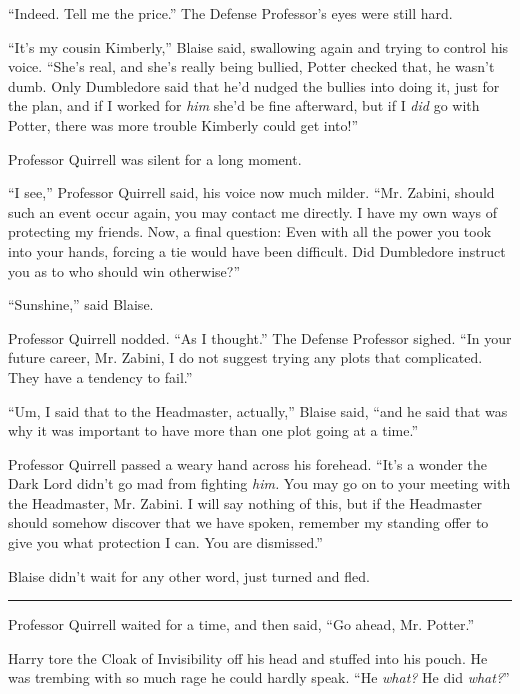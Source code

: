 ``Indeed. Tell me the price.'' The Defense Professor's eyes were still hard.

``It's my cousin Kimberly,'' Blaise said, swallowing again and trying to control his voice. ``She's real, and she's really being bullied, Potter checked that, he wasn't dumb. Only Dumbledore said that he'd nudged the bullies into doing it, just for the plan, and if I worked for \emph{him} she'd be fine afterward, but if I \emph{did} go with Potter, there was more trouble Kimberly could get into!''

Professor Quirrell was silent for a long moment.

``I see,'' Professor Quirrell said, his voice now much milder. ``Mr. Zabini, should such an event occur again, you may contact me directly. I have my own ways of protecting my friends. Now, a final question: Even with all the power you took into your hands, forcing a tie would have been difficult. Did Dumbledore instruct you as to who should win otherwise?''

``Sunshine,'' said Blaise.

Professor Quirrell nodded. ``As I thought.'' The Defense Professor sighed. ``In your future career, Mr. Zabini, I do not suggest trying any plots that complicated. They have a tendency to fail.''

``Um, I said that to the Headmaster, actually,'' Blaise said, ``and he said that was why it was important to have more than one plot going at a time.''

Professor Quirrell passed a weary hand across his forehead. ``It's a wonder the Dark Lord didn't go mad from fighting \emph{him.} You may go on to your meeting with the Headmaster, Mr. Zabini. I will say nothing of this, but if the Headmaster should somehow discover that we have spoken, remember my standing offer to give you what protection I can. You are dismissed.''

Blaise didn't wait for any other word, just turned and fled.

\begin{center}\rule{3in}{0.4pt}\end{center}

Professor Quirrell waited for a time, and then said, ``Go ahead, Mr. Potter.''

Harry tore the Cloak of Invisibility off his head and stuffed into his pouch. He was trembing with so much rage he could hardly speak. ``He \emph{what?} He did \emph{what?}''

